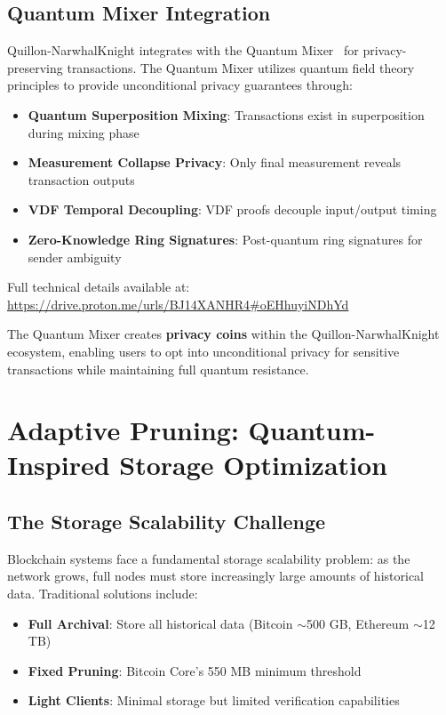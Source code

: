 \documentclass[11pt,a4paper]{article}
\begin{document}
\subsection{Quantum Mixer Integration}

Quillon-NarwhalKnight integrates with the Quantum Mixer~\cite{quantummixer2025} for privacy-preserving transactions. The Quantum Mixer utilizes quantum field theory principles to provide unconditional privacy guarantees through:

\begin{itemize}
    \item \textbf{Quantum Superposition Mixing}: Transactions exist in superposition during mixing phase
    \item \textbf{Measurement Collapse Privacy}: Only final measurement reveals transaction outputs
    \item \textbf{VDF Temporal Decoupling}: VDF proofs decouple input/output timing
    \item \textbf{Zero-Knowledge Ring Signatures}: Post-quantum ring signatures for sender ambiguity
\end{itemize}

Full technical details available at: \url{https://drive.proton.me/urls/BJ14XANHR4#oEHhuyiNDhYd}

The Quantum Mixer creates \textbf{privacy coins} within the Quillon-NarwhalKnight ecosystem, enabling users to opt into unconditional privacy for sensitive transactions while maintaining full quantum resistance.

\section{Adaptive Pruning: Quantum-Inspired Storage Optimization}

\subsection{The Storage Scalability Challenge}

Blockchain systems face a fundamental storage scalability problem: as the network grows, full nodes must store increasingly large amounts of historical data. Traditional solutions include:

\begin{itemize}
    \item \textbf{Full Archival}: Store all historical data (Bitcoin $\sim$500 GB, Ethereum $\sim$12 TB)
    \item \textbf{Fixed Pruning}: Bitcoin Core's 550 MB minimum threshold
    \item \textbf{Light Clients}: Minimal storage but limited verification capabilities
\end{itemize}
\end{document}
